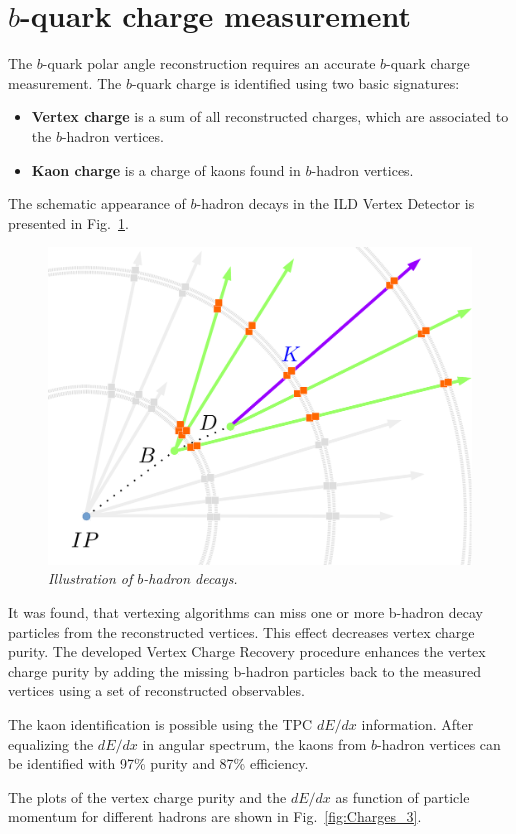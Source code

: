 \documentclass{PoS}
\begin{document}
\section{$b$-quark charge measurement}

The $b$-quark polar angle reconstruction requires an accurate $b$-quark charge measurement. 
The $b$-quark charge is identified using two basic signatures:
\begin{itemize}
	\item \textbf{Vertex charge} is a sum of all reconstructed charges, which are associated to the $b$-hadron vertices. 
	\item \textbf{Kaon charge} is a charge of kaons found in $b$-hadron vertices. 
\end{itemize}

The schematic appearance of $b$-hadron decays in the ILD Vertex Detector is presented in Fig.~\ref{fig:vtx}.

\begin{figure}
	{\centering
		\includegraphics[width=0.45\linewidth]{../poster/figures/vtx.pdf}
		\caption{\sl Illustration of $b$-hadron decays. }
		\label{fig:vtx}
	}
\end{figure}
It was found, that vertexing algorithms can miss one or more b-hadron decay particles from the reconstructed vertices. This effect decreases vertex charge purity.
The developed Vertex Charge Recovery procedure enhances the vertex charge purity by adding the missing b-hadron particles back to the measured vertices using a set of reconstructed observables. 


The kaon identification is possible using the TPC $dE/dx$ information. After equalizing the $dE/dx$ in angular spectrum, the kaons from $b$-hadron vertices can be identified with 97\% purity and 87\% efficiency.

The plots of the vertex charge purity and the $dE/dx$ as function of particle momentum for different hadrons are shown in Fig.~\ref{fig:Charges_3}.
\end{document}
